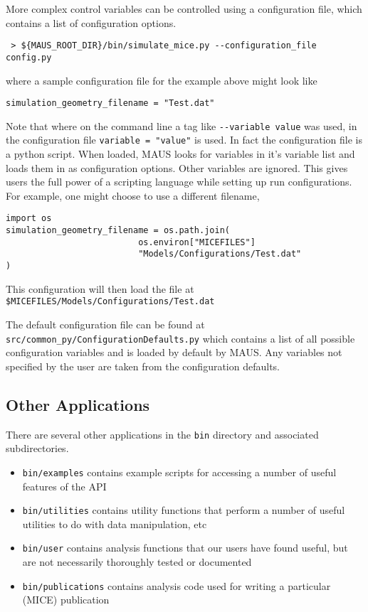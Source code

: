 More complex control variables can be controlled using a configuration file, which contains a list of configuration options.
\begin{verbatim}
 > ${MAUS_ROOT_DIR}/bin/simulate_mice.py --configuration_file config.py
\end{verbatim}
where a sample configuration file for the example above might look like
\begin{verbatim}
simulation_geometry_filename = "Test.dat"
\end{verbatim}
Note that where on the command line a tag like \verb|--variable value| was used, in the configuration file \verb|variable = "value"| is used. In fact the configuration file is a python script. When loaded, MAUS looks for variables in it's variable list and loads them in as configuration options. Other variables are ignored. This gives users the full power of a scripting language while setting up run configurations. For example, one might choose to use a different filename,
\begin{verbatim}
import os
simulation_geometry_filename = os.path.join(
                          os.environ["MICEFILES"]
                          "Models/Configurations/Test.dat"
)
\end{verbatim}
This configuration will then load the file at \verb|$MICEFILES/Models/Configurations/Test.dat|

The default configuration file can be found at \verb|src/common_py/ConfigurationDefaults.py| which contains a list of all possible configuration variables and is loaded by default by MAUS. Any variables not specified by the user are taken from the configuration defaults.

\subsection{Other Applications}
There are several other applications in the \verb|bin| directory and associated subdirectories.
\begin{itemize}
\item \verb|bin/examples| contains example scripts for accessing a number of useful features of the API
\item \verb|bin/utilities| contains utility functions that perform a number of useful utilities to do with data manipulation, etc
\item \verb|bin/user| contains analysis functions that our users have found useful, but are not necessarily thoroughly tested or documented
\item \verb|bin/publications| contains analysis code used for writing a particular (MICE) publication
\end{itemize}

